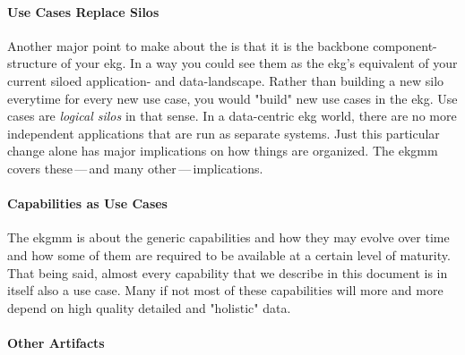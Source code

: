 \paragraph{Use Cases Replace Silos}

Another major point to make about the  is that it is the backbone component-structure
of your \gls{ekg}.
In a way you could see them as the \gls{ekg}'s equivalent of your current siloed application- and data-landscape.
Rather than building a new silo everytime for every new use case, you would "build" new use cases in the \gls{ekg}.
Use cases are \textit{logical silos} in that sense.
In a data-centric \gls{ekg} world, there are no more independent applications that are run as separate systems.
Just this particular change alone has major implications on how things are organized.
The \gls{ekgmm} covers these\,---\,and many other\,---\,implications.

\paragraph{Capabilities as Use Cases}

The \gls{ekgmm} is about the generic capabilities and how they may evolve over time and how some of them are
required to be available at a certain level of maturity.
That being said, almost every capability that we describe in this document is in itself also a use case.
Many if not most of these capabilities will more and more depend on high quality detailed and "holistic" data.

\paragraph{Other Artifacts}

